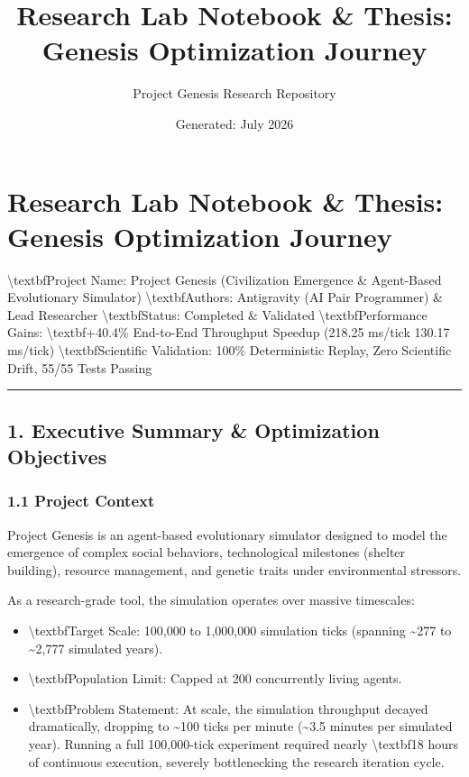 \documentclass[11pt,a4paper]{article}
\title{\textbf{Research Lab Notebook & Thesis: Genesis Optimization Journey}}
\author{Project Genesis Research Repository}
\date{\small Generated: July 2026}
\begin{document}
\maketitle
\thispagestyle{empty}

\newpage
\section*{ Research Lab Notebook \& Thesis: Genesis Optimization Journey}
\textbackslash{}textbf{Project Name:} Project Genesis (Civilization Emergence \& Agent-Based Evolutionary Simulator)  
\textbackslash{}textbf{Authors:} Antigravity (AI Pair Programmer) \& Lead Researcher  
\textbackslash{}textbf{Status:} Completed \& Validated  
\textbackslash{}textbf{Performance Gains:} \textbackslash{}textbf{+40.4\% End-to-End Throughput Speedup} (218.25 ms/tick  130.17 ms/tick)  
\textbackslash{}textbf{Scientific Validation:} 100\% Deterministic Replay, Zero Scientific Drift, 55/55 Tests Passing  

\noindent\rule{\textwidth}{0.4pt}

\subsection*{1. Executive Summary \& Optimization Objectives}

\subsubsection*{1.1 Project Context}
Project Genesis is an agent-based evolutionary simulator designed to model the emergence of complex social behaviors, technological milestones (shelter building), resource management, and genetic traits under environmental stressors. 

As a research-grade tool, the simulation operates over massive timescales:
\begin{itemize}
  \item \textbackslash{}textbf{Target Scale:} 100,000 to 1,000,000 simulation ticks (spanning \textasciitilde{}277 to \textasciitilde{}2,777 simulated years).
  \item \textbackslash{}textbf{Population Limit:} Capped at 200 concurrently living agents.
  \item \textbackslash{}textbf{Problem Statement:} At scale, the simulation throughput decayed dramatically, dropping to \textasciitilde{}100 ticks per minute (\textasciitilde{}3.5 minutes per simulated year). Running a full 100,000-tick experiment required nearly \textbackslash{}textbf{18 hours} of continuous execution, severely bottlenecking the research iteration cycle.
\end{itemize}
\end{document}
